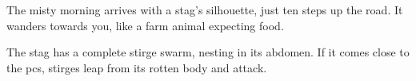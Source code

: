 \begin{boxtext}
  The misty morning arrives with a stag's silhouette, just ten \glspl{step} up
  the road.  It wanders towards you, like a farm animal expecting food.
\end{boxtext}


The stag has a complete stirge swarm, nesting in its abdomen.  If it comes
close to the \glspl{pc}, stirges leap from its rotten body and attack.

\stirgeSwarm
